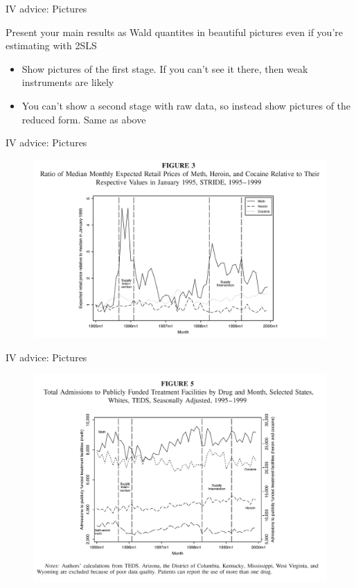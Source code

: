 \documentclass{beamer}
\begin{document}
\begin{frame}{IV advice: Pictures}

  Present your main results as Wald quantites in beautiful pictures even if you're estimating with 2SLS
  \begin{itemize}
    \item Show pictures of the first stage. If you can't see it there, then weak instruments are likely
    \item You can't show a second stage with raw data, so instead show pictures of the reduced form. Same as above
  \end{itemize}

\end{frame}



\begin{frame}{IV advice: Pictures}

  \begin{figure}
    \includegraphics[scale=0.15]{./lecture_includes/keith_1.png}
  \end{figure}

\end{frame}


\begin{frame}{IV advice: Pictures}

  \begin{figure}
    \includegraphics[scale=0.15]{./lecture_includes/keith_3.png}
  \end{figure}

\end{frame}
\end{document}
